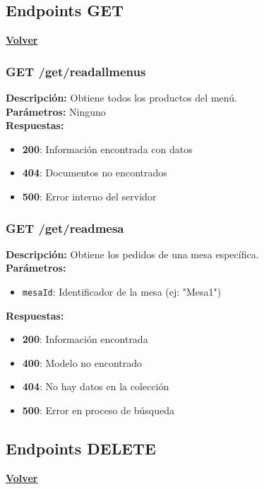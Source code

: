 \documentclass[12pt]{article}
\begin{document}
\clearpage

\subsection{Endpoints GET}
\hyperlink{anchor-indice}{\textbf{Volver}}\\

\subsubsection{GET /get/readallmenus}
\textbf{Descripción:} Obtiene todos los productos del menú.\\

\textbf{Parámetros:} Ninguno\\

\textbf{Respuestas:}
\begin{itemize}
    \item \textbf{200}: Información encontrada con datos
    \item \textbf{404}: Documentos no encontrados
    \item \textbf{500}: Error interno del servidor
\end{itemize}

\subsubsection{GET /get/readmesa}
\textbf{Descripción:} Obtiene los pedidos de una mesa específica.\\

\textbf{Parámetros:}
\begin{itemize}
    \item \texttt{mesaId}: Identificador de la mesa (ej: "Mesa1")
\end{itemize}

\textbf{Respuestas:}
\begin{itemize}
    \item \textbf{200}: Información encontrada
    \item \textbf{400}: Modelo no encontrado
    \item \textbf{404}: No hay datos en la colección
    \item \textbf{500}: Error en proceso de búsqueda
\end{itemize}

\clearpage

\subsection{Endpoints DELETE}
\hyperlink{anchor-indice}{\textbf{Volver}}\\
\end{document}

